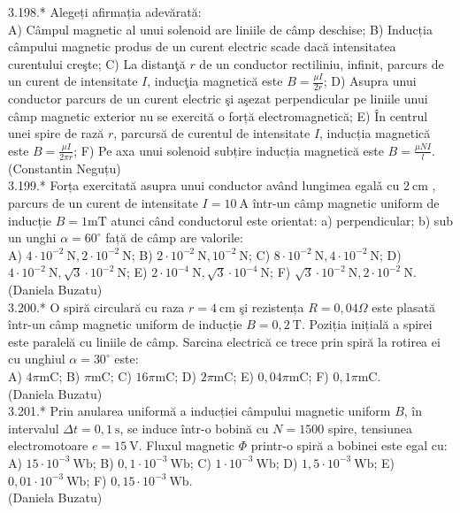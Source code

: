 3.198.* Alegeți afirmația adevărată:\\ A) Câmpul magnetic al unui solenoid are liniile de câmp deschise; B) Inducția câmpului magnetic produs de un curent electric scade dacă intensitatea curentului creşte; C) La distanţă $r$ de un conductor rectiliniu, infinit, parcurs de un curent de intensitate $I$, inducţia magnetică este $B=\frac{\mu I}{2 r}$; D) Asupra unui conductor parcurs de un curent electric şi aşezat perpendicular pe liniile unui câmp magnetic exterior nu se exercită o forță electromagnetică; E) În centrul unei spire de rază $r$, parcursă de curentul de intensitate $I$, inducția magnetică este $B=\frac{\mu I}{2 \pi r}$; F) Pe axa unui solenoid subțire inducția magnetică este $B=\frac{\mu N I}{l}$.\\ (Constantin Neguțu)\\

3.199.* Forța exercitată asupra unui conductor având lungimea egalǎ cu $2 \mathrm{~cm}$ , parcurs de un curent de intensitate $I=10 \mathrm{~A}$ într-un câmp magnetic uniform de inducție $B=1 \mathrm{mT}$ atunci când conductorul este orientat: a) perpendicular; b) sub un unghi $\alpha=60^{\circ}$ față de câmp are valorile:\\ A) $4 \cdot 10^{-2} \mathrm{~N}, 2 \cdot 10^{-2} \mathrm{~N}$; B) $2 \cdot 10^{-2} \mathrm{~N}, 10^{-2} \mathrm{~N}$; C) $8 \cdot 10^{-2} \mathrm{~N}, 4 \cdot 10^{-2} \mathrm{~N}$; D) $4 \cdot 10^{-2} \mathrm{~N}, \sqrt{3} \cdot 10^{-2} \mathrm{~N}$; E) $2 \cdot 10^{-4} \mathrm{~N}, \sqrt{3} \cdot 10^{-4} \mathrm{~N}$; F) $\sqrt{3} \cdot 10^{-2} \mathrm{~N}, 2 \cdot 10^{-2} \mathrm{~N}$.\\ (Daniela Buzatu)\\

3.200.* O spiră circulară cu raza $r=4 \mathrm{~cm}$ şi rezistența $R=0,04 \Omega$ este plasată într-un câmp magnetic uniform de inducție $B=0,2 \mathrm{~T}$. Poziția inițială a spirei este paralelă cu liniile de câmp. Sarcina electrică ce trece prin spiră la rotirea ei cu unghiul $\alpha=30^{\circ}$ este:\\ A) $4 \pi \mathrm{mC}$; B) $\pi \mathrm{mC}$; C) $16 \pi \mathrm{mC}$; D) $2 \pi \mathrm{mC}$; E) $0,04 \pi \mathrm{mC}$; F) $0,1 \pi \mathrm{mC}$.\\ (Daniela Buzatu)\\

3.201.* Prin anularea uniformă a inducției câmpului magnetic uniform $B$, în intervalul $\Delta t=0,1 \mathrm{~s}$, se induce într-o bobină cu $N=1500$ spire, tensiunea electromotoare $e=15 \mathrm{~V}$. Fluxul magnetic $\Phi$ printr-o spiră a bobinei este egal cu:\\ A) $15 \cdot 10^{-3} \mathrm{~Wb}$; B) $0,1 \cdot 10^{-3} \mathrm{~Wb}$; C) $1 \cdot 10^{-3} \mathrm{~Wb}$; D) $1,5 \cdot 10^{-3} \mathrm{~Wb}$; E) $0,01 \cdot 10^{-3} \mathrm{~Wb}$; F) $0,15 \cdot 10^{-3} \mathrm{~Wb}$.\\ (Daniela Buzatu)\\

